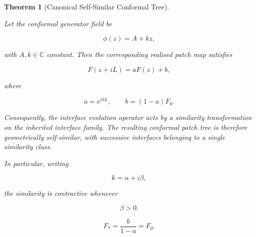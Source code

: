 \documentclass[11pt,a4paper]{article}
\newtheorem{theorem}{Theorem}[section]
\begin{document}
\begin{theorem}[Canonical Self-Similar Conformal Tree]
\label{cor:canonical_selfsimilar}

Let the conformal generator field be

\[
    \phi(z)=A+kz,
\]

with $A,k\in\mathbb{C}$ constant. Then the corresponding realised
patch map satisfies

\[
    F(z+iL)
    =
    aF(z)+b,
\]

where

\[
    a=e^{ikL},
    \qquad
    b=(1-a)F_0.
\]

Consequently, the interface evolution operator acts by a similarity
transformation on the inherited interface family. The resulting
conformal patch tree is therefore geometrically self-similar, with
successive interfaces belonging to a single similarity class.

In particular, writing

\[
k=\alpha+i\beta,
\]

the similarity is contractive whenever

\[
\beta>0.
\]

\[
    F_*=\frac{b}{1-a}=F_0.
\]

\end{theorem}
\end{document}
